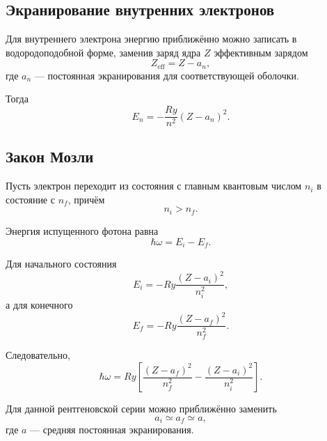 \documentclass[../final.tex]{subfiles}
\begin{document}
\subsection{Экранирование внутренних электронов}

Для внутреннего электрона энергию приближённо можно записать
в водородоподобной форме, заменив заряд ядра \(Z\) эффективным зарядом
\begin{equation*}
    Z_{\mathrm{eff}}
    =
    Z-a_n,
\end{equation*}
где \(a_n\) --- постоянная экранирования для соответствующей оболочки.

Тогда
\begin{equation*}
    \boxed{
        E_n
        =
        -\frac{Ry}{n^2}
        (Z-a_n)^2
    }.
\end{equation*}

\subsection{Закон Мозли}

Пусть электрон переходит из состояния с главным квантовым числом
\(n_i\) в состояние с \(n_f\), причём
\begin{equation*}
    n_i>n_f.
\end{equation*}

Энергия испущенного фотона равна
\begin{equation*}
    \hbar\omega
    =
    E_i-E_f.
\end{equation*}

Для начального состояния
\begin{equation*}
    E_i
    =
    -Ry
    \frac{(Z-a_i)^2}{n_i^2},
\end{equation*}
а для конечного
\begin{equation*}
    E_f
    =
    -Ry
    \frac{(Z-a_f)^2}{n_f^2}.
\end{equation*}

Следовательно,
\begin{equation*}
    \boxed{
        \hbar\omega
        =
        Ry
        \left[
            \frac{(Z-a_f)^2}{n_f^2}
            -
            \frac{(Z-a_i)^2}{n_i^2}
        \right]
    }.
\end{equation*}

Для данной рентгеновской серии можно приближённо заменить
\begin{equation*}
    a_i\simeq a_f\simeq a,
\end{equation*}
где \(a\) --- средняя постоянная экранирования.
\end{document}
